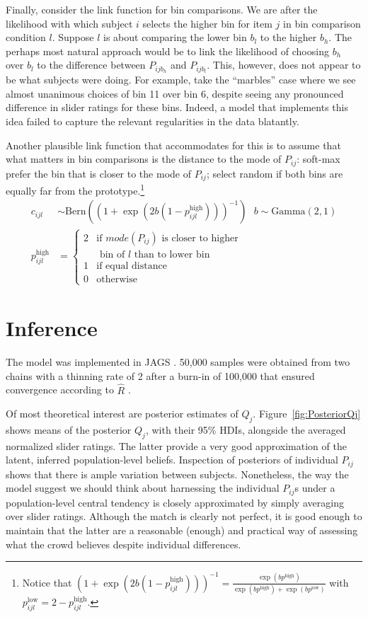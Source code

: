 \documentclass[10pt,letterpaper]{article}
\begin{document}
Finally, consider the link function for bin comparisons. We are after the likelihood with which
subject $i$ selects the higher bin for item $j$ in bin comparison condition $l$. Suppose $l$ is
about comparing the lower bin $b_l$ to the higher $b_h$. The perhaps most natural approach
would be to link the likelihood of choosing $b_h$ over $b_l$ to the difference between
$P_{ijb_h}$ and $P_{ijb_l}$. This, however, does not appear to be what subjects were doing. For
example, take the ``marbles'' case where we see almost unanimous choices of bin 11 over bin 6,
despite seeing any pronounced difference in slider ratings for these bins. Indeed, a model that
implements this idea failed to capture the relevant regularities in the data blatantly.

Another plausible link function that accommodates for this is to assume that what matters in
bin comparisons is the distance to the mode of $P_{ij}$: soft-max prefer the bin that is closer
to the mode of $P_{ij}$; select random if both bins are equally far from the
prototype.\footnote{Notice that
  $(1 + \exp(2b(1-p^{\text{high}}_{ijl})) )^{-1} = \frac{\exp(b p^{\text{high}})}{\exp(b
    p^{\text{high}}) + \exp(b p^{\text{low}})}$
  with $p^\text{low}_{ijl} = 2 - p^\text{high}_{ijl}$.}
\begin{align*}
  c_{ijl} & \sim \text{Bern}( (1 + \exp(2b(1-p^{\text{high}}_{ijl})) )^{-1} ) \ \ \ 
  b  \sim \text{Gamma}(2,1) \\
  p^\text{high}_{ijl} & = \begin{cases}
    2 & \text{if $mode(P_{ij})$ is closer to higher} \\
    & \text{ bin of $l$ than to lower bin } \\ 1 & \text{if equal
      distance} \\ 0 & \text{otherwise}  
  \end{cases}
\end{align*}


\section{Inference}

The model was implemented in JAGS \cite{Plummer2003:JAGS:-A-Program}. 50,000 samples were
obtained from two chains with a thinning rate of 2 after a burn-in of 100,000 that ensured
convergence according to $\hat{R}$ \cite{GelmanRubin1992:Inference-from-}.

Of most theoretical interest are posterior estimates of $Q_j$. Figure~\ref{fig:PosteriorQj}
shows means of the posterior $Q_j$, with their 95\% HDIs, alongside the averaged normalized
slider ratings. The latter provide a very good approximation of the latent, inferred
population-level beliefs. Inspection of posteriors of individual $P_{ij}$ shows that there is
ample variation between subjects. Nonetheless, the way the model suggest we should think about
harnessing the individual $P_{ij}$s under a population-level central tendency is closely
approximated by simply averaging over slider ratings. Although the match is clearly not
perfect, it is good enough to maintain that the latter are a reasonable (enough) and practical
way of assessing what the crowd believes despite individual differences.
\end{document}
